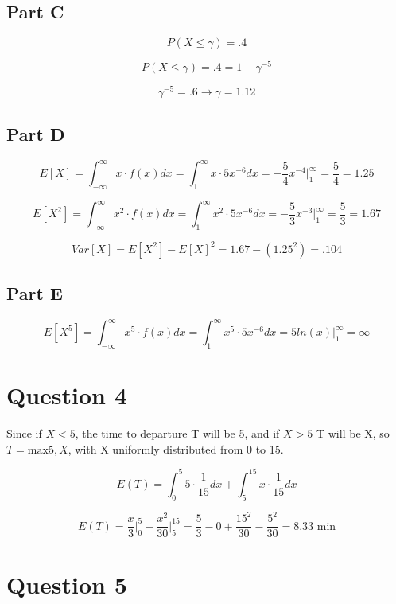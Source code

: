 \documentclass[letterpaper]{article}
\begin{document}
\subsection*{Part C}

$$P(X \leq \gamma) = .4$$

$$P(X \leq \gamma) = .4 = 1 - \gamma^{-5}$$

$$\gamma^{-5} = .6 \longrightarrow \gamma  = 1.12$$

\subsection*{Part D}

$$E[X] = \int_{-\infty}^{\infty} x \cdot f(x) dx = \int_{1}^{\infty} x \cdot 5x^{-6} dx = -\frac{5}{4} x^{-4} \Big|_{1}^{\infty} = \frac{5}{4} = 1.25 $$

$$E[X^2] = \int_{-\infty}^{\infty} x^2 \cdot f(x) dx = \int_{1}^{\infty} x^2 \cdot 5x^{-6} dx = -\frac{5}{3} x^{-3} \Big|_{1}^{\infty} = \frac{5}{3} = 1.67 $$

$$Var[X] = E[X^2] - E[X]^2 = 1.67 - (1.25^2) = .104$$

\subsection*{Part E}

$$E[X^5] = \int_{-\infty}^{\infty} x^5 \cdot f(x) dx = \int_{1}^{\infty} x^5 \cdot 5x^{-6} dx = 5 ln(x) \Big|_{1}^{\infty} = \infty $$

\newpage

\section*{Question 4}

Since if $X < 5$, the time to departure  T will be 5, and if $X > 5$ T will be X, so $T = \text{max}{5, X}$, with X uniformly distributed from 0 to 15.

$$E(T) = \int_0^5 5 \cdot \frac{1}{15} dx + \int_5^{15} x \cdot \frac{1}{15} dx$$

$$E(T) = \frac{x}{3} \Big|_0^5 + \frac{x^2}{30} \Big|_5^{15} = \frac{5}{3} - 0 + \frac{15^2}{30} - \frac{5^2}{30} = 8.33 \text{ min}$$

\newpage

\section*{Question 5}
\end{document}
